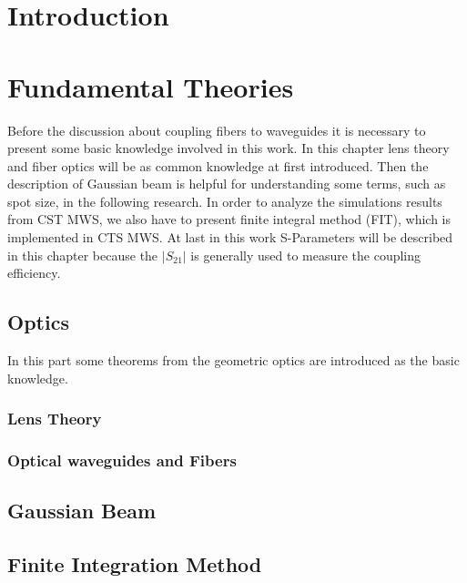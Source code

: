 
\chapter{Introduction}



\chapter{Fundamental Theories}
\label{chp:background}
Before the discussion about coupling fibers to waveguides it is necessary to present some basic knowledge involved in this work.  In this chapter lens theory and fiber optics will be as common knowledge at first introduced. Then the description of Gaussian beam is helpful for understanding some terms, such as spot size, in the following research.  
In order to analyze the simulations results from CST MWS, we also have to present finite integral method (FIT), which is implemented in CTS MWS. At last in this work S-Parameters will be described in this chapter because the $|S_{21}|$ is generally used to measure the coupling efficiency. 

\section{Optics}
\label{sect:background_optics}
In this part some theorems from the geometric optics  are introduced as the basic knowledge.
\subsection{Lens Theory}

\subsection{Optical waveguides and Fibers}


\section{Gaussian Beam}
\label{sect:gaussian_beam}


\section{Finite Integration Method}




